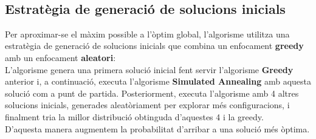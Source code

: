 \documentclass[a4paper,12pt]{report}
\begin{document}
\begin{itemize}
\begin{algorithm}[H]
  
	\
	
\end{algorithm}

\newpage

\subsection{Estratègia de generació de solucions inicials}
Per aproximar-se el màxim possible a l'òptim global, l'algorisme utilitza una estratègia de generació de solucions inicials que combina un enfocament \textbf{greedy} amb un enfocament \textbf{aleatori}:\\
L'algorisme genera una primera solució inicial fent servir l'algorisme \textbf{Greedy} anterior i, a continuació, executa l'algorisme \textbf{Simulated Annealing} amb aquesta solució com a punt de partida.
Posteriorment, executa l'algorisme amb 4 altres solucions inicials, generades aleatòriament per explorar més configuracions, i finalment tria la millor distribució obtinguda d'aquestes 4 i la greedy.\\
D'aquesta manera augmentem la probabilitat d'arribar a una solució més òptima.


\end{itemize}
\end{document}
